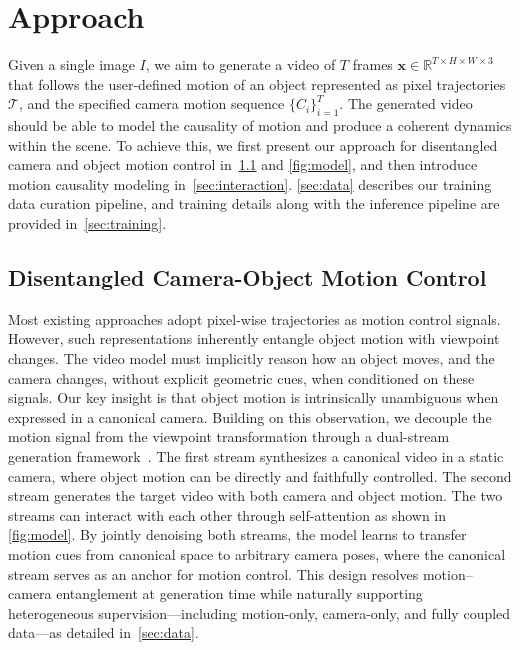 
\section{Approach}
\label{sec:approach}



Given a single image $I$, we aim to generate a video of $T$ frames $\mathbf{x} \in \mathbb{R}^{T \times H \times W \times 3}$ that follows the user-defined motion of an object represented as pixel trajectories $\mathcal{T}$, and the specified camera motion sequence $\{C_i\}_{i=1}^{T}$. The generated video should be able to model the causality of motion and produce a coherent dynamics within the scene.
To achieve this, we first present our approach for disentangled camera and object motion control in~\cref{sec:disentangle} and \cref{fig:model}, and then introduce motion causality modeling in~\cref{sec:interaction}.
\cref{sec:data} describes our training data curation pipeline, and training details along with the inference pipeline are provided in~\cref{sec:training}.


\subsection{Disentangled Camera-Object Motion Control}
\label{sec:disentangle}
Most existing approaches adopt pixel-wise trajectories as motion control signals. However, such representations inherently entangle object motion with viewpoint changes. The video model must implicitly reason how an object moves, and the camera changes, without explicit geometric cues, when conditioned on these signals.
Our key insight is that object motion is intrinsically unambiguous when expressed in a canonical camera. Building on this observation, we decouple the motion signal from the viewpoint transformation through a dual-stream generation framework~\cite{bai2025recammaster, bai2024syncammaster}. The first stream synthesizes a canonical video in a static camera, where object motion can be directly and faithfully controlled. The second stream generates the target video with both camera and object motion. The two streams can interact with each other through self-attention as shown in \cref{fig:model}.
By jointly denoising both streams, the model learns to transfer motion cues from canonical space to arbitrary camera poses, where the canonical stream serves as an anchor for motion control. This design resolves motion–camera entanglement at generation time while naturally supporting heterogeneous supervision—including motion-only, camera-only, and fully coupled data—as detailed in~\cref{sec:data}.

